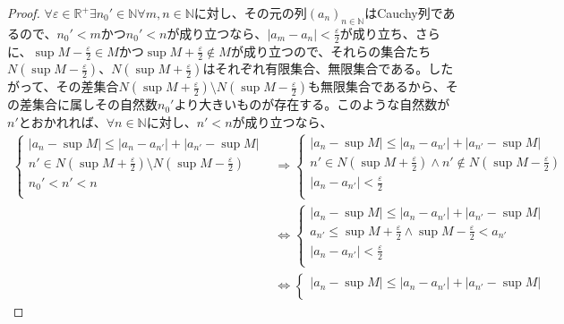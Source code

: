 \documentclass[dvipdfmx]{jsarticle}
\begin{document}
\begin{proof}
$\forall\varepsilon \in \mathbb{R}^{+}\exists n_{0}' \in \mathbb{N}\forall m,n \in \mathbb{N}$に対し、その元の列$\left( a_{n} \right)_{n \in \mathbb{N}}$はCauchy列であるので、$n_{0}' < m$かつ$n_{0}' < n$が成り立つなら、$\left| a_{m} - a_{n} \right| < \frac{\varepsilon}{2}$が成り立ち、さらに、$\sup M - \frac{\varepsilon}{2} \in M$かつ$\sup M + \frac{\varepsilon}{2} \notin M$が成り立つので、それらの集合たち$N\left( \sup M - \frac{\varepsilon}{2} \right)$、$N\left( \sup M + \frac{\varepsilon}{2} \right)$はそれぞれ有限集合、無限集合である。したがって、その差集合$N\left( \sup M + \frac{\varepsilon}{2} \right) \setminus N\left( \sup M - \frac{\varepsilon}{2} \right)$も無限集合であるから、その差集合に属しその自然数$n_{0}'$より大きいものが存在する。このような自然数が$n'$とおかれれば、$\forall n \in \mathbb{N}$に対し、$n' < n$が成り立つなら、
\begin{align*}
\left\{ \begin{matrix}
\left| a_{n} - \sup M \right| \leq \left| a_{n} - a_{n'} \right| + \left| a_{n'} - \sup M \right| \\
n' \in N\left( \sup M + \frac{\varepsilon}{2} \right) \setminus N\left( \sup M - \frac{\varepsilon}{2} \right) \\
n_{0}' < n' < n \\
\end{matrix} \right. &\Rightarrow \left\{ \begin{matrix}
\left| a_{n} - \sup M \right| \leq \left| a_{n} - a_{n'} \right| + \left| a_{n'} - \sup M \right| \\
n' \in N\left( \sup M + \frac{\varepsilon}{2} \right) \land n' \notin N\left( \sup M - \frac{\varepsilon}{2} \right) \\
\left| a_{n} - a_{n'} \right| < \frac{\varepsilon}{2} \\
\end{matrix} \right.\ \\
&\Leftrightarrow \left\{ \begin{matrix}
\left| a_{n} - \sup M \right| \leq \left| a_{n} - a_{n'} \right| + \left| a_{n'} - \sup M \right| \\
a_{n'} \leq \sup M + \frac{\varepsilon}{2} \land \sup M - \frac{\varepsilon}{2} < a_{n'} \\
\left| a_{n} - a_{n'} \right| < \frac{\varepsilon}{2} \\
\end{matrix} \right.\ \\
&\Leftrightarrow \left\{ \begin{matrix}
\left| a_{n} - \sup M \right| \leq \left| a_{n} - a_{n'} \right| + \left| a_{n'} - \sup M \right| \\

\end{matrix}
\end{align*}
\end{proof}
\end{document}

